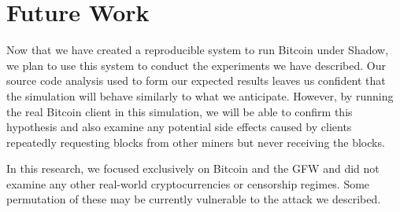 \section{Future Work}
Now that we have created a reproducible system to run Bitcoin under Shadow, we plan to use this system to conduct the experiments we have described. Our source code analysis used to form our expected results leaves us confident that the simulation will behave similarly to what we anticipate. However, by running the real Bitcoin client in this simulation, we will be able to confirm this hypothesis and also examine any potential side effects caused by clients repeatedly requesting blocks from other miners but never receiving the blocks.

In this research, we focused exclusively on Bitcoin and the GFW and did not examine any other real-world cryptocurrencies or censorship regimes. Some permutation of these may be currently vulnerable to the attack we described. 
